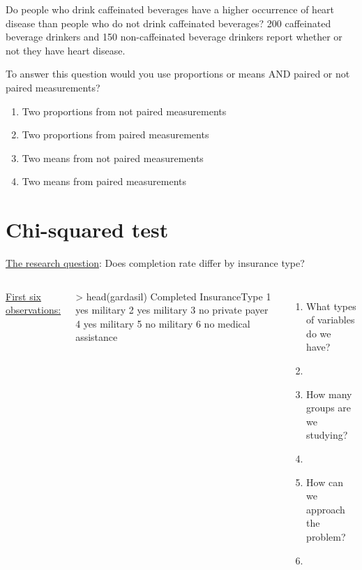 \begin{frame}
Do people who drink caffeinated beverages have a higher occurrence of heart disease than people who do not drink caffeinated beverages? 200 caffeinated beverage drinkers and 150  non-caffeinated beverage drinkers report whether or not they have heart disease.
\begin{clicker}{To answer this question would you use proportions or means AND paired or not paired measurements?}
\begin{enumerate}
    \item
    Two proportions from not paired measurements
    \item
    Two proportions from paired measurements
    \item
    Two means from not paired measurements
    \item
    Two means from paired measurements
\end{enumerate}
\end{clicker}
\end{frame}


\section[Chi-squared test]{Chi-squared test}
\begin{frame}
\end{frame}

\begin{frame}[fragile]
\underline{The research question}: Does completion rate differ by insurance type?
\vskip10pt
\begin{columns}
\underline{First six observations:}
\begin{lcverbatim}
> head(gardasil)
  Completed       InsuranceType
1       yes            military
2       yes            military
3        no       private payer
4       yes            military
5        no            military
6        no  medical assistance
\end{lcverbatim}
\begin{enumerate}
\item
What types of variables do we have?
\item[]
\item
How many groups are we studying?
\item[]
\item
How can we approach the problem?
\item[]
\end{enumerate}
\end{columns}
\end{frame}

